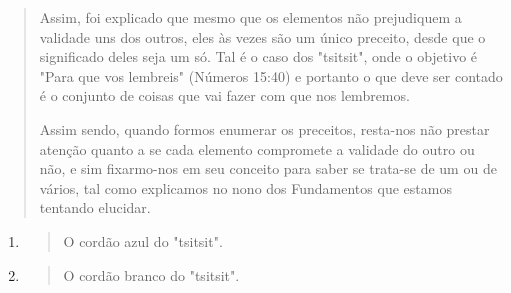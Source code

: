 \begin{quote}
Assim, foi explicado que mesmo que os elementos não prejudiquem a
validade uns dos outros, eles às vezes são um único preceito, desde que
o significado deles seja um só. Tal é o caso dos "tsitsit", onde o
objetivo é "Para que vos lembreis" (Números 15:40) e portanto o que deve
ser contado é o con­junto de coisas que vai fazer com que nos lembremos.

Assim sendo, quando formos enumerar os preceitos, resta-nos não prestar
atenção quanto a se cada elemento compromete a validade do outro ou não,
e sim fixarmo-nos em seu conceito para saber se trata-se de um ou de
vários, tal como explicamos no nono dos Fundamentos que estamos tentando
elucidar.
\end{quote}

\begin{enumerate}
\def\labelenumi{\arabic{enumi}.}
\setcounter{enumi}{20}
\item
 \begin{quote}
 O cordão azul do "tsitsit".
 \end{quote}
\item
 \begin{quote}
 O cordão branco do "tsitsit".
 \end{quote}
\end{enumerate}

